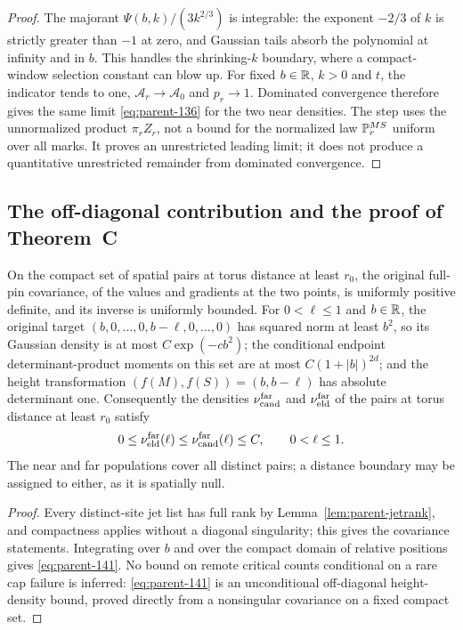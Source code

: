 \begin{proof}
The majorant $\Psi(b,k)/(3k^{2/3})$ is integrable: the exponent $-2/3$ of $k$ is strictly greater than $-1$ at zero, and Gaussian tails absorb the polynomial at infinity and in $b$. This handles the shrinking-$k$ boundary, where a compact-window selection constant can blow up. For fixed $b\in\mathbb R$, $k>0$ and $t$, the indicator tends to one, $\mathcal A_r\to\mathcal A_0$ and $p_r\to1$. Dominated convergence therefore gives the same limit \eqref{eq:parent-136} for the two near densities. The step uses the unnormalized product $\pi_rZ_r$, not a bound for the normalized law $\mathbb P^{MS}_r$ uniform over all marks. It proves an unrestricted leading limit; it does not produce a quantitative unrestricted remainder from dominated convergence.
\end{proof}

\subsection{The off-diagonal contribution and the proof of Theorem~C}\label{ssec:parent-far}

\begin{lemma}\label{lem:parent-far}
On the compact set of spatial pairs at torus distance at least $r_0$, the original full-pin covariance, of the values and gradients at the two points, is uniformly positive definite, and its inverse is uniformly bounded. For $0<\ell\le1$ and $b\in\mathbb R$, the original target $(b,0,\dots,0,b-\ell,0,\dots,0)$ has squared norm at least $b^2$, so its Gaussian density is at most $C\exp(-cb^2)$; the conditional endpoint determinant-product moments on this set are at most $C(1+|b|)^{2d}$; and the height transformation $(f(M),f(S))=(b,b-\ell)$ has absolute determinant one. Consequently the densities $\nu^{\rm far}_{\mathrm{cand}}$ and $\nu^{\rm far}_{\mathrm{eld}}$ of the pairs at torus distance at least $r_0$ satisfy
\begin{equation}\label{eq:parent-141}
0\le\nu^{\rm far}_{\mathrm{eld}}(\ell)\le\nu^{\rm far}_{\mathrm{cand}}(\ell)\le C,\qquad 0<\ell\le1 .
\end{equation}
The near and far populations cover all distinct pairs; a distance boundary may be assigned to either, as it is spatially null.
\end{lemma}

\begin{proof}
Every distinct-site jet list has full rank by Lemma~\ref{lem:parent-jetrank}, and compactness applies without a diagonal singularity; this gives the covariance statements. Integrating over $b$ and over the compact domain of relative positions gives \eqref{eq:parent-141}. No bound on remote critical counts conditional on a rare cap failure is inferred: \eqref{eq:parent-141} is an unconditional off-diagonal height-density bound, proved directly from a nonsingular covariance on a fixed compact set.
\end{proof}


